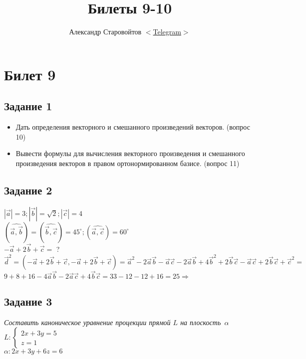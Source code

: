 \documentclass[a4paper]{article}
\author{Александр Старовойтов %
$<$\href{https://t.me/stewkk}%
{Telegram}$>$}
\title{Билеты 9-10}
\theoremstyle{definition}
\theoremstyle{plain}
\begin{document}
\maketitle
\section*{Билет 9}
\subsection*{Задание 1}
\begin{itemize}
  \item
Дать определения векторного и смешанного произведений векторов. (вопрос 10)
  \item
Вывести формулы для вычисления векторного произведения и смешанного произведения векторов в правом ортонормированном базисе. (вопрос 11)
\end{itemize}
\subsection*{Задание 2}
$|\vec{a}| = 3; |\vec{b}| = \sqrt{2}; |\vec{c}| = 4$\\
$( \widehat{\vec{a}, \vec{b}} ) = ( \widehat{\vec{b}, \vec{c}} ) = 45^{\circ}; ( \widehat{\vec{a}, \vec{c}} ) = 60^{\circ}$\\
$-\vec{a} + 2 \vec{b} + \vec{c} =$ ?\\

$\vec{d}^{2}=(-\vec{a} + 2 \vec{b} + \vec{c}, -\vec{a} + 2 \vec{b} + \vec{c}) = \vec{a}^{2} -2 \vec{a} \vec{b} - \vec{a} \vec{c} - 2 \vec{a} \vec{b} + 4 \vec{b}^{2} + 2 \vec{b} \vec{c} - \vec{a} \vec{c} + 2 \vec{b} \vec{c} + \vec{c}^{2} =$\\
$9 + 8 + 16 - 4 \vec{a}\vec{b} - 2 \vec{a}\vec{c} + 4 \vec{b}\vec{c} = 33 - 12 - 12 + 16 = 25 \Rightarrow$ 
\subsection*{Задание 3}
\emph{Составить каноническое уравнение процекции прямой $L$ на \mbox{плоскость $\alpha$}}\\
$L: \begin{cases}
  2x + 3y = 5\\
  z = 1
\end{cases}$\\
$\alpha: 2x+3y+6z = 6$
\end{document}
